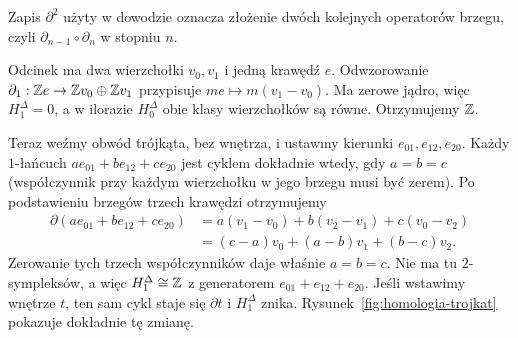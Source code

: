 Zapis $\partial^2$ użyty w dowodzie oznacza złożenie dwóch kolejnych
operatorów brzegu, czyli $\partial_{n-1}\circ\partial_n$ w stopniu $n$.

\begin{przyklad}
\label{prz:homologia-odcinek-okrag}
Odcinek ma dwa wierzchołki $v_0,v_1$
i jedną krawędź $e$. Odwzorowanie
$\partial_1:\mathbb{Z} e\to\mathbb{Z} v_0\oplus\mathbb{Z} v_1$
przypisuje $me\mapsto m(v_1-v_0)$.
Ma zerowe jądro, więc $H_1^\Delta=0$,
a w ilorazie $H_0^\Delta$ obie klasy
wierzchołków są równe. Otrzymujemy $\mathbb{Z}$.

Teraz weźmy obwód trójkąta, bez wnętrza,
i ustawmy kierunki $e_{01},e_{12},e_{20}$.
Każdy $1$-łańcuch
$ae_{01}+be_{12}+ce_{20}$ jest cyklem
dokładnie wtedy, gdy $a=b=c$
(współczynnik przy każdym wierzchołku
w jego brzegu musi być zerem).
Po podstawieniu brzegów trzech krawędzi otrzymujemy
\[
 \begin{aligned}
 \partial(ae_{01}+be_{12}+ce_{20})
 &=a(v_1-v_0)+b(v_2-v_1)+c(v_0-v_2)\\
 &=(c-a)v_0+(a-b)v_1+(b-c)v_2.
 \end{aligned}
\]
Zerowanie tych trzech współczynników daje właśnie $a=b=c$.
Nie ma tu $2$-sympleksów, a więc
$H_1^\Delta\cong\mathbb{Z}$ z generatorem
$e_{01}+e_{12}+e_{20}$.
Jeśli wstawimy wnętrze $t$, ten sam
cykl staje się $\partial t$ i
$H_1^\Delta$ znika. Rysunek~\ref{fig:homologia-trojkat}
pokazuje dokładnie tę zmianę.
\end{przyklad}

